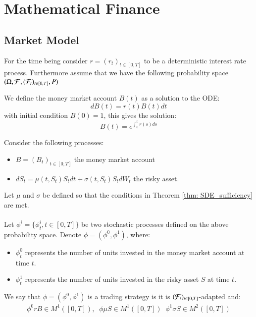 \chapter{Mathematical Finance}
\label{chp_mathematical_finance}

\section{Market Model}
For the time being consider $r = (r_{t})_{t\in [0,T]}$ to be a deterministic interest rate process. Furthermore assume that we have the following probability space $(\Omega, \mathcal{F}, (\bar{\mathcal{F}}_{t})_{t\in [0,T]}, P)$

\begin{definition}
We define the money market account $B(t)$ as a solution to the ODE: 
$$
dB(t) = r(t)B(t)dt
$$
with initial condition $B(0) = 1$, this gives the solution:
$$
B(t) = e^{\int_{0}^{t}r(s)ds}
$$
\end{definition}

Consider the following processes:
\begin{itemize}
    \item $B = (B_{t})_{t\in [0,T]}$ the money market account
    \item $
    dS_{t} = \mu(t,S_{t})S_{t}dt + \sigma(t,S_{t})S_{t}dW_{t}$ the risky asset. 
    
\end{itemize}

Let $\mu$ and $\sigma$ be defined so that the conditions in Theorem \ref{thm: SDE_sufficiency} are met. 
\\~\\ 
Let $\phi^{i} = \{\phi_{t}^{i}, t \in [0,T]\}$ be two stochastic processes defined on the above probability space. Denote $\phi = (\phi^{0}, \phi^{1})$, where:
\begin{itemize}
    \item $\phi_{t}^{0}$ represents the number of units invested in the money market account at time $t$.
    \item $\phi_{t}^{1}$ represents the number of units invested in the risky asset $S$ at time $t$. 
\end{itemize}

\begin{definition}
We say that $\phi = (\phi^{0}, \phi^{1})$ is a trading strategy is it is $(\mathcal{F}_{t})_{t\in [0,T]}$-adapted and: 
\begin{align*}
\phi^{0}rB \in M^{1}([0,T]), \;\; \phi \mu S \in M^{1}([0,T])\;\; \phi^{1}\sigma S \in M^{2}([0,T])    
\end{align*}
\end{definition}


